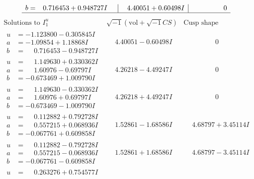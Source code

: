 \documentclass[1p]{elsarticle_modified}
\theoremstyle{definition}
\newcommand{\I}{\sqrt{-1}}
\begin{document}
$$\begin{array}{c|c|c}
\begin{aligned}
b &= \phantom{-}0.716453 + 0.948727 I\end{aligned}
 & \phantom{-}4.40051 + 0.60498 I & \phantom{-0.000000 } 0\\
 \hline 
 \end{array}$$\newpage$$\begin{array}{c|c|c}  
\text{Solutions to }I^u_{1}& \I (\text{vol} + \sqrt{-1}CS) & \text{Cusp shape}\\
 \hline 
\begin{aligned}
u &= -1.123800 - 0.305845 I \\
a &= -1.09854 + 1.18868 I \\
b &= \phantom{-}0.716453 - 0.948727 I\end{aligned}
 & \phantom{-}4.40051 - 0.60498 I & \phantom{-0.000000 } 0 \\ \hline\begin{aligned}
u &= \phantom{-}1.149630 + 0.330362 I \\
a &= \phantom{-}1.60976 - 0.69797 I \\
b &= -0.673469 + 1.009790 I\end{aligned}
 & \phantom{-}4.26218 - 4.49247 I & \phantom{-0.000000 } 0 \\ \hline\begin{aligned}
u &= \phantom{-}1.149630 - 0.330362 I \\
a &= \phantom{-}1.60976 + 0.69797 I \\
b &= -0.673469 - 1.009790 I\end{aligned}
 & \phantom{-}4.26218 + 4.49247 I & \phantom{-0.000000 } 0 \\ \hline\begin{aligned}
u &= \phantom{-}0.112882 + 0.792728 I \\
a &= \phantom{-}0.557215 + 0.068936 I \\
b &= -0.067761 + 0.609858 I\end{aligned}
 & \phantom{-}1.52861 - 1.68586 I & \phantom{-}4.68797 + 3.45114 I \\ \hline\begin{aligned}
u &= \phantom{-}0.112882 - 0.792728 I \\
a &= \phantom{-}0.557215 - 0.068936 I \\
b &= -0.067761 - 0.609858 I\end{aligned}
 & \phantom{-}1.52861 + 1.68586 I & \phantom{-}4.68797 - 3.45114 I \\ \hline\begin{aligned}
u &= \phantom{-}0.263276 + 0.754577 I \\

\end{aligned}
\end{array}$$
\end{document}
